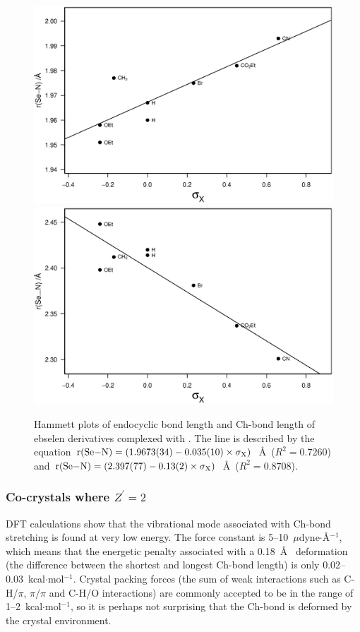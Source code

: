 \begin{refsection}
\begin{figure}
  \centering
  \includegraphics[width=0.9\linewidth]{Figures/hammett-endo-morph.eps}
  \includegraphics[width=0.9\linewidth]{Figures/hammett-morph.eps}
  \caption{Hammett plots of endocyclic  bond length and  Ch-bond length of ebselen derivatives complexed with . The line is described by the equation $\mathrm{r}(\ce{Se-N}) = (1.9673(34) - 0.035(10) \times \sigma_{\mathrm{X}})$~\AA~($R^2=0.7260$) and $\mathrm{r}(\ce{Se-N}) = (2.397(77) - 0.13(2) \times \sigma_{\mathrm{X}})$~\AA~($R^2=0.8708$).}
  \label{fig:hammett-morph}
\end{figure}

\subsubsection{Co-crystals where \texorpdfstring{$Z^\prime=2$}{Z'=2}}
DFT calculations show that the vibrational mode associated with Ch-bond stretching is found at very low energy.
The force constant is 5--10~$\mu$dyne$\cdot$\AA$^{-1}$, which means that the energetic penalty associated with a 0.18~\AA~ deformation (the difference between the shortest and longest Ch-bond length) is only 0.02--0.03~kcal$\cdot$mol$^{-1}$.
Crystal packing forces (the sum of weak interactions such as C-H/$\pi$, $\pi /\pi$ and C-H/O interactions) are commonly accepted to be in the range of 1--2~kcal$\cdot$mol$^{-1}$, so it is perhaps not surprising that the Ch-bond is deformed by the crystal environment.\autocite{Dunitz1988}


\end{refsection}
